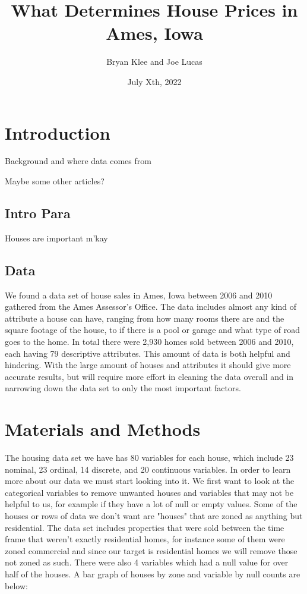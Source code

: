 \documentclass{article}
\title{What Determines House Prices in Ames, Iowa}
\author{Bryan Klee and Joe Lucas}
\date{July Xth, 2022}
\begin{document}
	\maketitle
	\section{Introduction}
	Background and where data comes from
	
	Maybe some other articles?
	
	\subsection{Intro Para}
	Houses are important m'kay
	
	\subsection{Data}
	We found a data set of house sales in Ames, Iowa between 2006 and 2010 gathered from the Ames Assessor's Office. The data includes almost any kind of attribute a house can have, ranging from how many rooms there are and the square footage of the house, to if there is a pool or garage and what type of road goes to the home. In total there were 2,930 homes sold between 2006 and 2010, each having 79 descriptive attributes. This amount of data is both helpful and hindering. With the large amount of houses and attributes it should give more accurate results, but will require more effort in cleaning the data overall and in narrowing down the data set to only the most important factors.
	 
	
	\section{Materials and Methods}
	The housing data set we have has 80 variables for each house, which include 23 nominal, 23 ordinal, 14 discrete, and 20 continuous variables. In order to learn more about our data we must start looking into it. We first want to look at the categorical variables to remove unwanted houses and variables that may not be helpful to us, for example if they have a lot of null or empty values. Some of the houses or rows of data we don't want are "houses" that are zoned as anything but residential. The data set includes properties that were sold between the time frame that weren't exactly residential homes, for instance some of them were zoned commercial and since our target is residential homes we will remove those not zoned as such. There were also 4 variables which had a null value for over half of the houses. A bar graph of houses by zone and variable by null counts are below:
	
\end{document}
